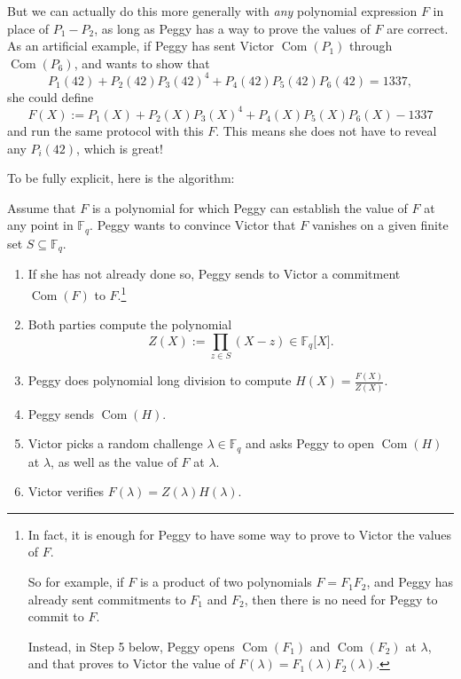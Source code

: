 But we can actually do this more generally with \emph{any} polynomial
expression \(F\) in place of \(P_{1} - P_{2}\), as long as Peggy has a
way to prove the values of \(F\) are correct. As an artificial example,
if Peggy has sent Victor \(\operatorname{Com}( P_{1} )\) through
\(\operatorname{Com}( P_{6} )\), and wants to show that
\[P_{1}(42) + P_{2}(42)P_{3}(42)^{4} + P_{4}(42)P_{5}(42)P_{6}(42) = 1337,\]
she could define
\[F(X) := P_{1}(X) + P_{2}(X)P_{3}(X)^{4} + P_{4}(X)P_{5}(X)P_{6}(X) - 1337\]
and run the same protocol with this \(F\). This means she does not have
to reveal any \(P_{i}(42)\), which is great!

To be fully explicit, here is the algorithm:

\begin{algo}
\label{root-check}
Assume that \(F\) is a polynomial for which Peggy can
establish the value of \(F\) at any point in \({\mathbb{F}}_{q}\). Peggy
wants to convince Victor that \(F\) vanishes on a given finite set
\(S \subseteq {\mathbb{F}}_{q}\).

\begin{enumerate}
\item
  If she has not already done so, Peggy sends to Victor a commitment
  \(\operatorname{Com}(F)\) to \(F\).\footnote{In fact, it is enough for
    Peggy to have some way to prove to Victor the values of \(F\).

    So for example, if \(F\) is a product of two polynomials
    \(F = F_{1}F_{2}\), and Peggy has already sent commitments to
    \(F_{1}\) and \(F_{2}\), then there is no need for Peggy to commit
    to \(F\).

    Instead, in Step 5 below, Peggy opens \(\operatorname{Com}(F_{1})\)
    and \(\operatorname{Com}(F_{2})\) at \(\lambda\), and that proves to
    Victor the value of \(F(\lambda) = F_{1}(\lambda)F_{2}(\lambda)\).}
\item
  Both parties compute the polynomial
  \[Z(X) := \prod_{z \in S}(X - z) \in {\mathbb{F}}_{q}\lbrack X\rbrack.\]
\item
  Peggy does polynomial long division to compute
  \(H(X) = \frac{F(X)}{Z(X)}\).
\item
  Peggy sends \(\operatorname{Com}(H)\).
\item
  Victor picks a random challenge \(\lambda \in {\mathbb{F}}_{q}\) and
  asks Peggy to open \(\operatorname{Com}(H)\) at \(\lambda\), as well
  as the value of \(F\) at \(\lambda\).
\item
  Victor verifies \(F(\lambda) = Z(\lambda)H(\lambda)\).
\end{enumerate}
\end{algo}

